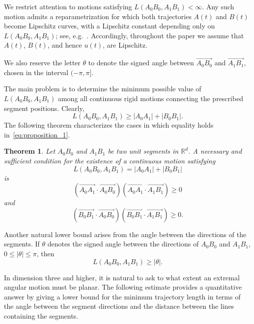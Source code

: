\documentclass[a4paper,12pt,reqno]{amsart}
\newtheorem{theorem}{Theorem}
\begin{document}
We restrict attention to motions satisfying \(L(A_0B_0,A_1B_1)<\infty\). Any such motion admits a reparametrization for which both trajectories \(A(t)\) and \(B(t)\) become Lipschitz curves, with a Lipschitz constant depending only on \(L(A_0B_0,A_1B_1)\); see, e.g.~\cite{Dubovitskii1976}. Accordingly, throughout the paper we assume that
\(A(t)\), \(B(t)\), and hence \(u(t)\), are Lipschitz. 

We also reserve the letter $\theta$ to denote the signed angle between $\overrightarrow{A_0B_0}$ and $\overrightarrow{A_1B_1}$, chosen in the interval $(-\pi,\pi]$.

The main problem is to determine the minimum possible value of $L(A_0B_0, A_1B_1)$ among all continuous rigid motions connecting the prescribed segment positions. Clearly, 
\begin{equation}
\label{eq:proposition_1}
L(A_0B_0, A_1B_1)\ge |A_0A_1|+|B_0B_1|.
\end{equation}
The following theorem characterizes the cases in which equality holds in~\eqref{eq:proposition_1}.
\begin{theorem}
\label{thm:iff_sliding}
Let $A_0B_0$ and $A_1B_1$ be two unit segments in $\mathbb{R}^d$. A necessary and sufficient condition for the existence of a continuous motion satisfying
$$L(A_0B_0, A_1B_1)= |A_0A_1|+|B_0B_1|$$
is
\begin{equation}
\label{eq:prop1_eq2}
\left(\overrightarrow{A_0A_1}\cdot \overrightarrow{A_0B_0}\right)
\left(\overrightarrow{A_0A_1}\cdot \overrightarrow{A_1B_1}\right)\ge 0
\end{equation}
and
\begin{equation}
\label{eq:prop1_eq3}
\left(\overrightarrow{B_0B_1}\cdot \overrightarrow{A_0B_0}\right)
\left(\overrightarrow{B_0B_1}\cdot \overrightarrow{A_1B_1}\right)\ge 0.
\end{equation}

\end{theorem}

\smallskip
Another natural lower bound arises from the angle between the directions of the segments. If $\theta$ denotes the signed angle between the directions of $A_0B_0$ and $A_1B_1$, $0\le |\theta|\le \pi$, then 
\[
L(A_0B_0,A_1B_1)\ge |\theta|.
\]

In dimension three and higher, it is natural to ask to what extent an extremal angular motion must be planar. The following estimate provides a quantitative answer by giving a lower bound for the minimum trajectory length in terms of the angle between the segment directions and the distance between the lines containing the segments.
\end{document}
